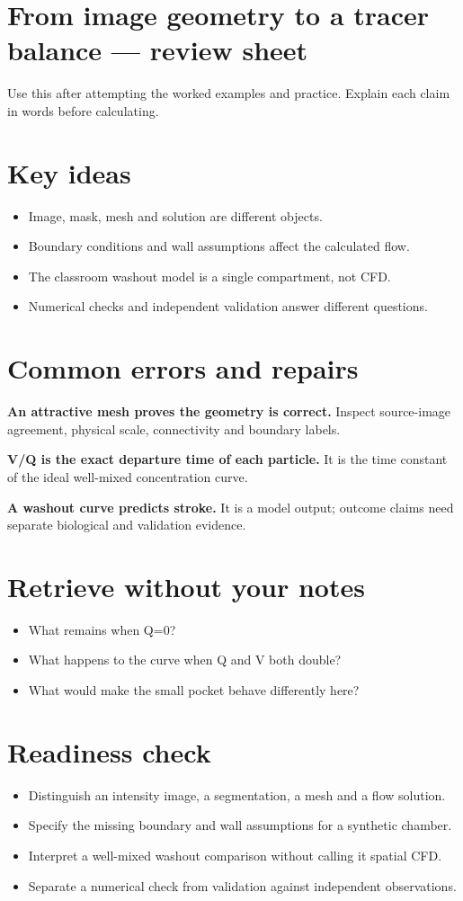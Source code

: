 \documentclass[11pt,letterpaper]{article}
\theoremstyle{definition}\newtheorem{definition}{Definition}\newtheorem{example}{Example}
\numberwithin{equation}{section}
\begin{document}
\section*{From image geometry to a tracer balance --- review sheet}
Use this after attempting the worked examples and practice. Explain each claim in words before calculating.

\section*{Key ideas}
\begin{itemize}
\item Image, mask, mesh and solution are different objects.
\item Boundary conditions and wall assumptions affect the calculated flow.
\item The classroom washout model is a single compartment, not CFD.
\item Numerical checks and independent validation answer different questions.
\end{itemize}
\section*{Common errors and repairs}
\textbf{An attractive mesh proves the geometry is correct.} Inspect source-image agreement, physical scale, connectivity and boundary labels.

\textbf{V/Q is the exact departure time of each particle.} It is the time constant of the ideal well-mixed concentration curve.

\textbf{A washout curve predicts stroke.} It is a model output; outcome claims need separate biological and validation evidence.

\section*{Retrieve without your notes}
\begin{itemize}
\item What remains when Q=\allowbreak{}0?
\item What happens to the curve when Q and V both double?
\item What would make the small pocket behave differently here?
\end{itemize}
\section*{Readiness check}
\begin{itemize}
\item Distinguish an intensity image, a segmentation, a mesh and a flow solution.
\item Specify the missing boundary and wall assumptions for a synthetic chamber.
\item Interpret a well-mixed washout comparison without calling it spatial CFD.
\item Separate a numerical check from validation against independent observations.
\end{itemize}
\end{document}
